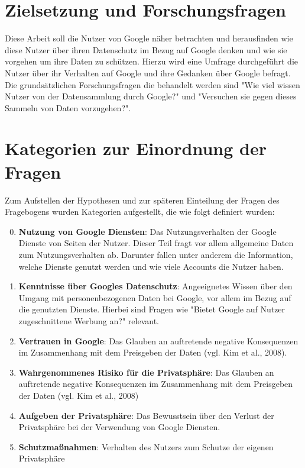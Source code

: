 \section{Zielsetzung und Forschungsfragen}
Diese Arbeit soll die Nutzer von Google näher betrachten und herausfinden wie diese Nutzer über ihren Datenschutz im Bezug auf Google denken und wie sie vorgehen um ihre Daten zu schützen. Hierzu wird eine Umfrage durchgeführt die Nutzer über ihr Verhalten auf Google und ihre Gedanken über Google befragt.
Die grundsätzlichen Forschungsfragen die behandelt werden sind "Wie viel wissen Nutzer von der Datensammlung durch Google?" und "Versuchen sie gegen dieses Sammeln von Daten vorzugehen?". 

\section{Kategorien zur Einordnung der Fragen}
\label{sec:categories}
Zum Aufstellen der Hypothesen und zur späteren Einteilung der Fragen des Fragebogens wurden Kategorien aufgestellt, die wie folgt definiert wurden:
\begin{enumerate}
\setcounter{enumi}{-1}
\item \label{itm:Kat0}\textbf{Nutzung von Google Diensten}: Das Nutzungsverhalten der Google Dienste von Seiten der Nutzer. Dieser Teil fragt vor allem allgemeine Daten zum Nutzungsverhalten ab. Darunter fallen unter anderem die Information, welche Dienste genutzt werden und wie viele Accounts die Nutzer haben.
\item \label{itm:Kat1}\textbf{Kenntnisse über Googles Datenschutz}: Angeeignetes Wissen über den Umgang mit personenbezogenen Daten bei Google, vor allem im Bezug auf die genutzten Dienste. Hierbei sind Fragen wie "Bietet Google auf Nutzer zugeschnittene Werbung an?" relevant.
\item \label{itm:Kat2}\textbf{Vertrauen in Google}: Das Glauben an auftretende negative Konsequenzen im Zusammenhang mit dem Preisgeben der Daten (vgl. Kim et al., 2008).
\item \label{itm:Kat3}\textbf{Wahrgenommenes Risiko für die Privatsphäre}: Das Glauben an auftretende negative Konsequenzen im Zusammenhang mit dem Preisgeben der Daten (vgl. Kim et al., 2008)
\item \label{itm:Kat4}\textbf{Aufgeben der Privatsphäre}: Das Bewusstsein über den Verlust der Privatsphäre bei der Verwendung von Google Diensten.
\item \label{itm:Kat5}\textbf{Schutzmaßnahmen}: Verhalten des Nutzers zum Schutze der eigenen Privatsphäre
\end{enumerate}

